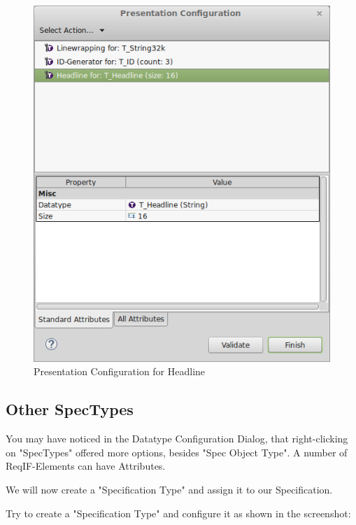 \begin{figure}[h!]
\centering      
\includegraphics[width=0.8\linewidth]{../rmf-images/Presentation_headline.png}      
\caption{Presentation Configuration for Headline}      
\label{fig:headlineConfig2}
\end{figure}

\subsection{Other SpecTypes}

You may have noticed in the Datatype Configuration Dialog, that
right-clicking on "SpecTypes" offered more options, besides "Spec
Object Type".  A number of ReqIF-Elements can have Attributes.

We will now create a "Specification Type" and assign it to our
Specification.

Try to create a "Specification Type" and configure it as shown in the
screenshot:


